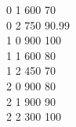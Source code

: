 \documentclass{article}
\begin{document}
0 \textbar\vspace{} 1 \textbar\vspace{} 600 \textbar\vspace{} 70\\
0 \textbar\vspace{} 2 \textbar\vspace{} 750 \textbar\vspace{} 90.99\\
1 \textbar\vspace{} 0 \textbar\vspace{} 900 \textbar\vspace{} 100\\
1 \textbar\vspace{} 1 \textbar\vspace{} 600 \textbar\vspace{} 80\\
1 \textbar\vspace{} 2 \textbar\vspace{} 450 \textbar\vspace{} 70\\
2 \textbar\vspace{} 0 \textbar\vspace{} 900 \textbar\vspace{} 80\\
2 \textbar\vspace{} 1 \textbar\vspace{} 900 \textbar\vspace{} 90\\
2 \textbar\vspace{} 2 \textbar\vspace{} 300 \textbar\vspace{} 100\\
\end{document}
